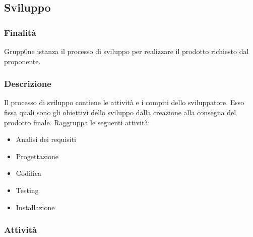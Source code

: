 \documentclass[../norme-di-progetto.tex]{subfiles}
\begin{document}
\subsection{Sviluppo}
\label{sub:sviluppo}
\subsubsection{Finalità}
\label{subs:finalità}
Grupp0ne istanza il processo di sviluppo per realizzare il prodotto richiesto dal proponente.
\subsubsection{Descrizione}
\label{subs:descrizione}
Il processo di sviluppo contiene le attività e i compiti dello sviluppatore. Esso fissa quali sono gli obiettivi dello sviluppo dalla creazione alla consegna del prodotto finale. Raggruppa le seguenti attività:
\begin{itemize}
	\item Analisi dei requisiti
	\item Progettazione
	\item Codifica
	\item Testing
	\item Installazione
\end{itemize}
\subsubsection{Attività}
\label{subs:attività}
\end{document}
